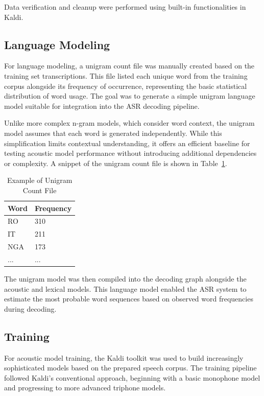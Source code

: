 \vspace{1em}

Data verification and cleanup were performed using built-in functionalities in Kaldi.

\subsection{Language Modeling}

For language modeling, a unigram count file was manually created based on the training set transcriptions. This file listed each unique word from the training corpus alongside its frequency of occurrence, representing the basic statistical distribution of word usage. The goal was to generate a simple unigram language model suitable for integration into the ASR decoding pipeline.

Unlike more complex n-gram models, which consider word context, the unigram model assumes that each word is generated independently. While this simplification limits contextual understanding, it offers an efficient baseline for testing acoustic model performance without introducing additional dependencies or complexity. A snippet of the unigram count file is shown in Table~\ref{tab:unigram}.

\begin{table}[h]
\centering
\caption{Example of Unigram Count File}
\label{tab:unigram}
\begin{tabular}{ll}
\toprule
\textbf{Word} & \textbf{Frequency} \\
\midrule
RO            & 310 \\
IT            & 211  \\
NGA           & 173  \\
...           & ... \\
\bottomrule
\end{tabular}
\end{table}

The unigram model was then compiled into the decoding graph alongside the acoustic and lexical models. This language model enabled the ASR system to estimate the most probable word sequences based on observed word frequencies during decoding.

\subsection{Training}

For acoustic model training, the Kaldi toolkit was used to build increasingly sophisticated models based on the prepared speech corpus. The training pipeline followed Kaldi's conventional approach, beginning with a basic monophone model and progressing to more advanced triphone models.

